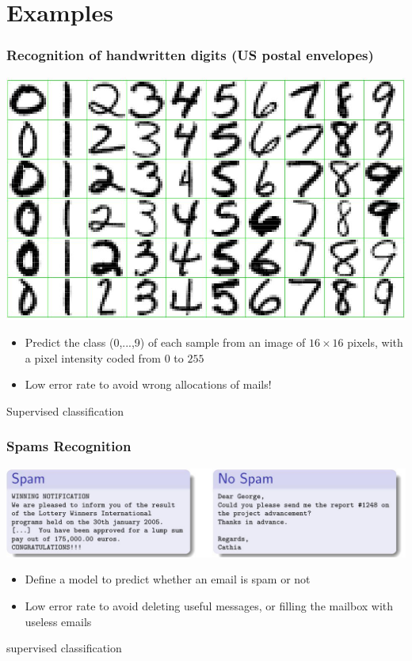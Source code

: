 \documentclass[pressentation,9pt,aspectratio=1610,xcolor=table]{beamer}
\newcommand{\doigt}{\noindent \Pisymbol{pzd}{43}}
\begin{document}
\section{Examples}
\begin{frame}
  \frametitle{Recognition of handwritten digits (US postal envelopes)}
    \begin{center}
      \includegraphics[width=.5\textwidth]{ex_handwriten.jpg}
    \end{center}
    \begin{itemize}
    \item[\doigt] Predict the class (0,...,9) of each sample from an image of 
      $16\times 16$ pixels, with a pixel intensity coded from $0$ to $255$
    \item Low error rate to avoid wrong allocations of mails!
    \end{itemize}
    \begin{center}
      \alert{Supervised classification }
    \end{center}
\end{frame}

\begin{frame}
  \frametitle{Spams Recognition}
    \begin{center}
      \includegraphics[width=.8\textwidth]{ex_spams.jpg}
    \end{center}
    \begin{itemize}
    \item[\doigt] 
      Define a model to predict whether an email is spam or not
    \item Low error rate to avoid deleting useful messages, or filling the mailbox with useless emails
    \end{itemize}
  \begin{center}
    \alert{supervised classification}
  \end{center}
  
\end{frame}
\end{document}
